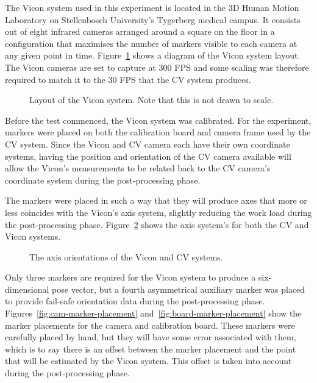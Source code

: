 The Vicon system used in this experiment is located in the 3D Human Motion Laboratory on Stellenbosch University's Tygerberg medical campus. It consists out of eight  infrared cameras arranged around a square on the floor in a configuration that maximises the number of markers visible to each camera at any given point in time. Figure~\ref{fig:vicon-layout} shows a diagram of the Vicon system layout. The Vicon cameras are set to capture at 300 FPS and some scaling was therefore required to match it to the 30 FPS that the CV system produces. 
 
\begin{figure}
  \centering
  
  \caption{Layout of the Vicon system. Note that this is not drawn to scale.}
\label{fig:vicon-layout}
\end{figure}

Before the test commenced, the Vicon system was calibrated. For the experiment, markers were placed on both the calibration board and camera frame used by the CV system. Since the Vicon and CV camera each have their own coordinate systems, having the position and orientation of the CV camera available will allow the Vicon's measurements to be related back to the CV camera's coordinate system during the post-processing phase. 

The markers were placed in such a way that they will produce axes that more or less coincides with the Vicon's axis system, slightly reducing the work load during the post-processing phase. Figure~\ref{fig:cam-vicon-axes} shows the axis system's for both the CV and Vicon systems.

\begin{figure}
  \centering
  \def\svgwidth{0.6\textwidth}
  
  \caption{The axis orientations of the Vicon and CV systems.}
\label{fig:cam-vicon-axes}
\end{figure}

Only three markers are required for the Vicon system to produce a six-dimensional pose vector, but a fourth asymmetrical auxiliary marker was placed to provide fail-safe orientation data during the post-processing phase. Figures~\ref{fig:cam-marker-placement} and~\ref{fig:board-marker-placement} show the marker placements for the camera and calibration board. These markers were carefully placed by hand, but they will have some error associated with them, which is to say there is an offset between the marker placement and the point that will be estimated by the Vicon system. This offset is taken into account during the post-processing phase.

